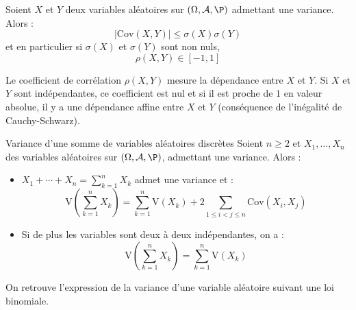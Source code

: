 \documentclass[french,11pt,twoside]{VcCours}
\begin{document}
\begin{Proposition}{} Soient $X$ et $Y$ deux variables aléatoires sur $(\Omega, \mathcal{A}, \P)$ admettant une variance. Alors :
$$ \vert \textrm{Cov}(X,Y) \vert \leq \sigma(X) \sigma(Y)$$
et en particulier si $\sigma(X)$ et $\sigma(Y)$ sont non nuls, 
$$ \rho(X,Y) \in [-1,1]$$
\end{Proposition}

\begin{Demonstration}{}

\vspace*{4cm}
\end{Demonstration}

\begin{Remarque}{} Le coefficient de corrélation $\rho(X,Y)$ \og mesure la dépendance \fg entre $X$ et $Y$. Si $X$ et $Y$ sont indépendantes, ce coefficient est nul et si il est proche de $1$ en valeur absolue, il y a une \og dépendance affine \fg entre $X$ et $Y$ (conséquence de l'inégalité de Cauchy-Schwarz).
\end{Remarque}

\begin{Proposition}{Variance d'une somme de variables aléatoires discrètes}
Soient $n \geq 2$ et $X_1, \ldots, X_n$ des variables aléatoires sur $(\Omega, \mathcal{A}, \P)$, admettant une variance. Alors :
\begin{itemize}
\item $X_1 + \cdots + X_n = \sum_{k=1}^n X_k$ admet une variance et :
$$ \textrm{V} \left(\sum_{k=1}^n X_k \right) = \sum_{k=1}^n \textrm{V}(X_k) + 2 \sum_{1\leq i<j \leq n} \textrm{Cov}(X_i,X_j)$$
\item Si de plus les variables sont deux à deux indépendantes, on a :
$$ \textrm{V} \left(\sum_{k=1}^n X_k \right) = \sum_{k=1}^n \textrm{V}(X_k)$$
\end{itemize}
\end{Proposition}

\begin{Demonstration}{}

\end{Demonstration}
\newpage


\begin{Remarque}{} On retrouve l'expression de la variance d'une variable aléatoire suivant une loi binomiale.

\vspace*{4cm}~
\end{Remarque}
\end{document}
